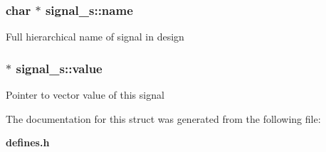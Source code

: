\subsubsection{\setlength{\rightskip}{0pt plus 5cm}char $\ast$ signal\_\-s::name}\label{structsignal__s_m0}


Full hierarchical name of signal in design 
\subsubsection{ $\ast$ signal\_\-s::value}\label{structsignal__s_m1}


Pointer to vector value of this signal 

The documentation for this struct was generated from the following file:\begin{CompactItemize}
\item 
{\bf defines.h}\end{CompactItemize}
